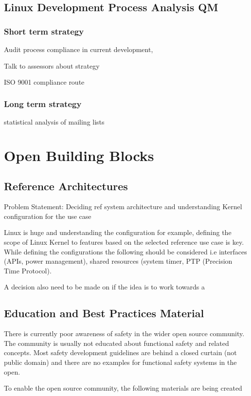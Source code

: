 \documentclass[12pt]{ElisaPaper}
\begin{document}
\subsection{Linux Development Process Analysis QM}

\subsubsection{Short term strategy}
Audit process compliance in current development, 

Talk to assessors about strategy

ISO 9001 compliance route

\subsubsection{Long term strategy}
statistical analysis of mailing lists




\section{Open Building Blocks}

\subsection{Reference Architectures}
Problem Statement: Deciding ref system architecture and understanding Kernel configuration for the use case

Linux is huge and understanding the configuration for example, defining the scope of Linux Kernel to features based on the selected reference use case is key. 
While defining the configurations the following should be considered i.e interfaces (APIs, power management), shared resources (system timer, PTP (Precision Time Protocol). 

A decision also need to be made on if the idea is to work towards a  
\subsection{Education and Best Practices Material}
There is currently poor awareness of safety in the wider open source community. 
The  community is usually not educated about functional safety and related concepts. 
Most safety development guidelines are behind a closed curtain (not public domain) and there are no examples for functional safety systems in the open.

To enable the open source community, the following materials are being created
\end{document}

